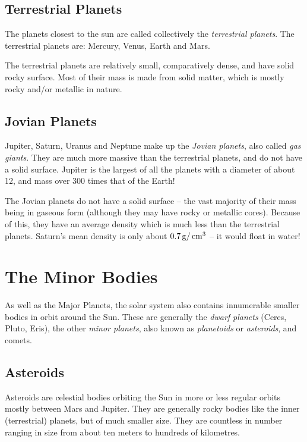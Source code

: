 \subsection{Terrestrial Planets}%

The planets closest to the sun are called collectively the
\emph{terrestrial planets}. The terrestrial planets are: Mercury, Venus,
Earth and Mars.

The terrestrial planets are relatively small, comparatively dense, and
have solid rocky surface. Most of their mass is made from solid matter,
which is mostly rocky and/or metallic in nature.

\subsection{Jovian Planets}%

Jupiter, Saturn, Uranus and Neptune make up the \emph{Jovian planets},
also called \emph{gas giants}. They are much more massive than the
terrestrial planets, and do not have a solid surface. Jupiter is the
largest of all the planets with a diameter of about 12, and mass over
300 times that of the Earth!

The Jovian planets do not have a solid surface -- the vast majority of
their mass being in gaseous form (although they may have rocky or
metallic cores). Because of this, they have an average density which is
much less than the terrestrial planets. Saturn's mean density is only
about $0.7 \g/\cm^3$ -- it would float in water!

\section{The Minor Bodies}%

As well as the Major Planets, the solar system also contains
innumerable smaller bodies in orbit around the Sun. These are
generally the \emph{dwarf planets} (Ceres, Pluto, Eris), the other
\emph{minor planets}, also known as \emph{planetoids} or
\emph{asteroids}, and comets.

\subsection{Asteroids}
\label{sec:Phenomena:Asteroids}

Asteroids are celestial bodies orbiting the Sun in more or less regular
orbits mostly between Mars and Jupiter. They are generally rocky bodies
like the inner (terrestrial) planets, but of much smaller size. They
are countless in number ranging in size from about ten meters to
hundreds of kilometres.

